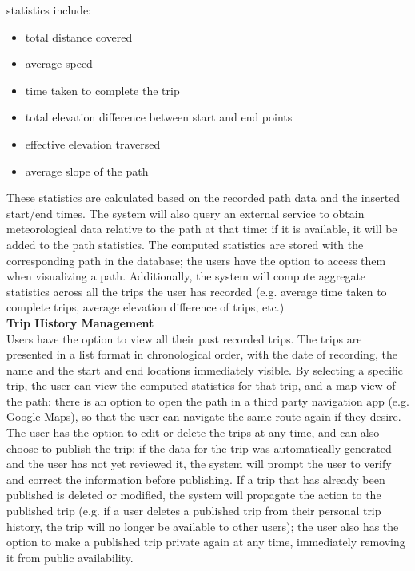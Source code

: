 statistics include:
\begin{itemize}
    \item total distance covered
    \item average speed
    \item time taken to complete the trip
    \item total elevation difference between start and end points
    \item effective elevation traversed
    \item average slope of the path 
\end{itemize}
These statistics are calculated based on the recorded path data and the inserted start/end times. The system 
will also query an external service to obtain meteorological data relative to the path at that time: if it is 
available, it will be added to the path statistics. The computed statistics are stored with the corresponding 
path in the database; the users have the option to access them when visualizing a path.
Additionally, the system will compute aggregate statistics across all the trips the user has recorded (e.g. 
average time taken to complete trips, average elevation difference of trips, etc.) \\
\newline
\textbf{Trip History Management} \\
Users have the option to view all their past recorded trips. The trips are presented in a list format in 
chronological order, with the date of recording, the name and the start and end locations immediately visible. 
By selecting a specific trip, the user can view the computed statistics for that trip, and a map view of the 
path: there is an option to open the path in a third party navigation app (e.g. Google Maps), so that the user 
can navigate the same route again if they desire. 
The user has the option to edit or delete the trips at any time, and can also choose to publish the trip: if 
the data for the trip was automatically generated and the user has not yet reviewed it,  the system will 
prompt the user to verify and correct the information before publishing. If a trip that has already been 
published is deleted or modified, the system will propagate the action to the published trip (e.g. if a user 
deletes a published trip from their personal trip history, the trip will no longer be available to other users); 
the user also has the option to make a published trip private again at any time, immediately removing it from 
public availability. \\
